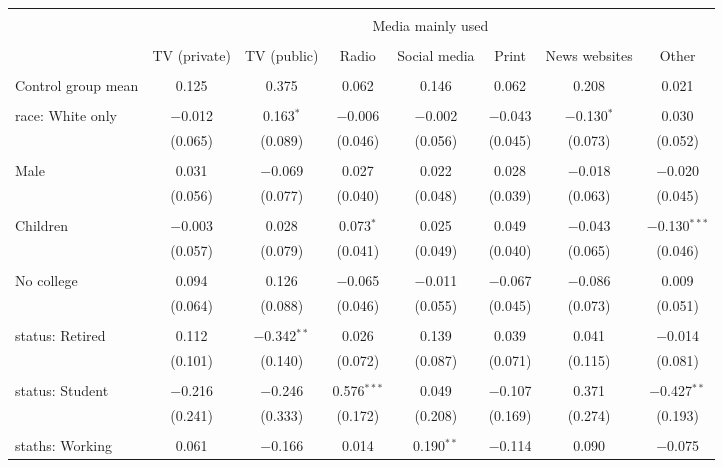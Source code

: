 
\begin{tabular}{@{\extracolsep{5pt}}lccccccc} 
\\[-1.8ex]\hline 
\hline \\[-1.8ex] 
 & \multicolumn{7}{c}{Media mainly used} \\ 
\cline{2-8} 
\\[-1.8ex] & TV (private) & TV (public) & Radio & Social media & Print & News websites & Other \\ 
\hline \\[-1.8ex] 
 Control group mean & 0.125 & 0.375 & 0.062 & 0.146 & 0.062 & 0.208 & 0.021  \\ \hline \\[-1.8ex] race: White only & $-$0.012 & 0.163$^{*}$ & $-$0.006 & $-$0.002 & $-$0.043 & $-$0.130$^{*}$ & 0.030 \\ 
  & (0.065) & (0.089) & (0.046) & (0.056) & (0.045) & (0.073) & (0.052) \\ 
  & & & & & & & \\ 
 Male & 0.031 & $-$0.069 & 0.027 & 0.022 & 0.028 & $-$0.018 & $-$0.020 \\ 
  & (0.056) & (0.077) & (0.040) & (0.048) & (0.039) & (0.063) & (0.045) \\ 
  & & & & & & & \\ 
 Children & $-$0.003 & 0.028 & 0.073$^{*}$ & 0.025 & 0.049 & $-$0.043 & $-$0.130$^{***}$ \\ 
  & (0.057) & (0.079) & (0.041) & (0.049) & (0.040) & (0.065) & (0.046) \\ 
  & & & & & & & \\ 
 No college & 0.094 & 0.126 & $-$0.065 & $-$0.011 & $-$0.067 & $-$0.086 & 0.009 \\ 
  & (0.064) & (0.088) & (0.046) & (0.055) & (0.045) & (0.073) & (0.051) \\ 
  & & & & & & & \\ 
 status: Retired & 0.112 & $-$0.342$^{**}$ & 0.026 & 0.139 & 0.039 & 0.041 & $-$0.014 \\ 
  & (0.101) & (0.140) & (0.072) & (0.087) & (0.071) & (0.115) & (0.081) \\ 
  & & & & & & & \\ 
 status: Student & $-$0.216 & $-$0.246 & 0.576$^{***}$ & 0.049 & $-$0.107 & 0.371 & $-$0.427$^{**}$ \\ 
  & (0.241) & (0.333) & (0.172) & (0.208) & (0.169) & (0.274) & (0.193) \\ 
  & & & & & & & \\ 
 staths: Working & 0.061 & $-$0.166 & 0.014 & 0.190$^{**}$ & $-$0.114 & 0.090 & $-$0.075 \\ 

\end{tabular}
